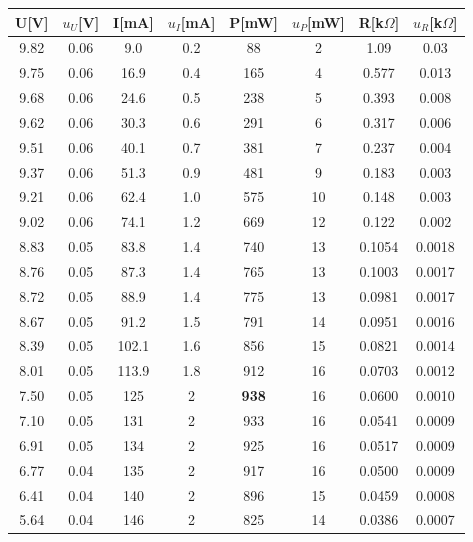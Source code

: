 \documentclass[12pt,a4paper]{article}
\begin{document}
\begin{table}[H]
    \centering
    \begin{tabular}{|c|c|c|c|c|c|c|c|}
    \hline
    U{[}V{]} & $u_U$[V] & I{[}mA{]} & $u_I$[mA] & P[mW] & $u_P$[mW] & R[k$\Omega$] & $u_R$[k$\Omega$]\\ \hline
    9.82    & 0.06 & 9.0       & 0.2 & 88  & 2  & 1.09    & 0.03    \\ \hline
    9.75    & 0.06 & 16.9      & 0.4 & 165 & 4  & 0.577   & 0.013   \\ \hline
    9.68    & 0.06  & 24.6      & 0.5 & 238 & 5  & 0.393   & 0.008   \\ \hline
    9.62    & 0.06  & 30.3      & 0.6 & 291 & 6  & 0.317   & 0.006   \\ \hline
    9.51    & 0.06  & 40.1      & 0.7 & 381 & 7  & 0.237   & 0.004   \\ \hline
    9.37    & 0.06  & 51.3      & 0.9 & 481 & 9  & 0.183   & 0.003   \\ \hline
    9.21    & 0.06  & 62.4      & 1.0 & 575 & 10 & 0.148   & 0.003   \\ \hline
    9.02    & 0.06  & 74.1      & 1.2 & 669 & 12 & 0.122   & 0.002   \\ \hline
    8.83    & 0.05  & 83.8      & 1.4 & 740 & 13 & 0.1054  & 0.0018  \\ \hline
    8.76    & 0.05  & 87.3      & 1.4 & 765 & 13 & 0.1003  & 0.0017  \\ \hline
    8.72    & 0.05  & 88.9      & 1.4 & 775 & 13 & 0.0981  & 0.0017  \\ \hline
    8.67    & 0.05  & 91.2      & 1.5 & 791 & 14 & 0.0951  & 0.0016  \\ \hline
    8.39    & 0.05  & 102.1     & 1.6 & 856 & 15 & 0.0821  & 0.0014  \\ \hline
    8.01    & 0.05  & 113.9     & 1.8 & 912 & 16 & 0.0703  & 0.0012  \\ \hline
    7.50    & 0.05  & 125       & 2   & \textbf{938} & 16 & 0.0600  & 0.0010  \\ \hline
    7.10    & 0.05  & 131       & 2   & 933 & 16 & 0.0541  & 0.0009  \\ \hline
    6.91    & 0.05 & 134       & 2   & 925 & 16 & 0.0517  & 0.0009  \\ \hline
    6.77    & 0.04 & 135       & 2   & 917 & 16 & 0.0500  & 0.0009  \\ \hline
    6.41    & 0.04 & 140       & 2   & 896 & 15 & 0.0459  & 0.0008  \\ \hline
    5.64    & 0.04 & 146       & 2   & 825 & 14 & 0.0386  & 0.0007  \\ \hline

\end{tabular}
\end{table}
\end{document}

